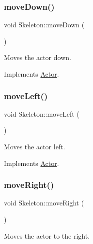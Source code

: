 \subsubsection{\texorpdfstring{moveDown()}{moveDown()}}
{\footnotesize\ttfamily void Skeleton\+::move\+Down (\begin{DoxyParamCaption}{ }\end{DoxyParamCaption})\hspace{0.3cm}{\ttfamily [virtual]}}



Moves the actor down. 



Implements \mbox{\hyperlink{classActor_ad2737cd62ea0c96f75853afb5d1fd83a}{Actor}}.

\mbox{\label{classSkeleton_ab03c65cdabc94f280443691653112d3a}} 
\subsubsection{\texorpdfstring{moveLeft()}{moveLeft()}}
{\footnotesize\ttfamily void Skeleton\+::move\+Left (\begin{DoxyParamCaption}{ }\end{DoxyParamCaption})\hspace{0.3cm}{\ttfamily [virtual]}}



Moves the actor left. 



Implements \mbox{\hyperlink{classActor_a522d6069bacaa9985db7a234bde2c8b6}{Actor}}.

\mbox{\label{classSkeleton_a3d8ce7b8a1d10e4a33a27f0eee54042e}} 
\subsubsection{\texorpdfstring{moveRight()}{moveRight()}}
{\footnotesize\ttfamily void Skeleton\+::move\+Right (\begin{DoxyParamCaption}{ }\end{DoxyParamCaption})\hspace{0.3cm}{\ttfamily [virtual]}}



Moves the actor to the right. 



